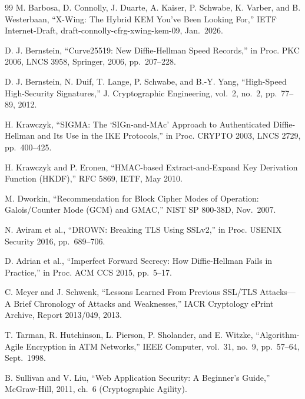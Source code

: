 \documentclass[10pt,journal,compsoc]{IEEEtran}
\begin{document}
\begin{thebibliography}{99}
 M. Barbosa, D. Connolly, J. Duarte, A. Kaiser, P. Schwabe, K. Varber, and B. Westerbaan, ``X-Wing: The Hybrid KEM You've Been Looking For,'' IETF Internet-Draft, draft-connolly-cfrg-xwing-kem-09, Jan.~2026.

 D. J. Bernstein, ``Curve25519: New Diffie-Hellman Speed Records,'' in Proc. PKC 2006, LNCS 3958, Springer, 2006, pp.~207--228.

 D. J. Bernstein, N. Duif, T. Lange, P. Schwabe, and B.-Y. Yang, ``High-Speed High-Security Signatures,'' J. Cryptographic Engineering, vol.~2, no.~2, pp.~77--89, 2012.

 H. Krawczyk, ``SIGMA: The `SIGn-and-MAc' Approach to Authenticated Diffie-Hellman and Its Use in the IKE Protocols,'' in Proc. CRYPTO 2003, LNCS 2729, pp.~400--425.

 H. Krawczyk and P. Eronen, ``HMAC-based Extract-and-Expand Key Derivation Function (HKDF),'' RFC 5869, IETF, May 2010.

 M. Dworkin, ``Recommendation for Block Cipher Modes of Operation: Galois/Counter Mode (GCM) and GMAC,'' NIST SP 800-38D, Nov.~2007.

 N. Aviram et al., ``DROWN: Breaking TLS Using SSLv2,'' in Proc. USENIX Security 2016, pp.~689--706.

 D. Adrian et al., ``Imperfect Forward Secrecy: How Diffie-Hellman Fails in Practice,'' in Proc. ACM CCS 2015, pp.~5--17.

 C. Meyer and J. Schwenk, ``Lessons Learned From Previous SSL/TLS Attacks---A Brief Chronology of Attacks and Weaknesses,'' IACR Cryptology ePrint Archive, Report 2013/049, 2013.

 T. Tarman, R. Hutchinson, L. Pierson, P. Sholander, and E. Witzke, ``Algorithm-Agile Encryption in ATM Networks,'' IEEE Computer, vol.~31, no.~9, pp.~57--64, Sept.~1998.

 B. Sullivan and V. Liu, ``Web Application Security: A Beginner's Guide,'' McGraw-Hill, 2011, ch.~6 (Cryptographic Agility).

\end{thebibliography}
\end{document}
